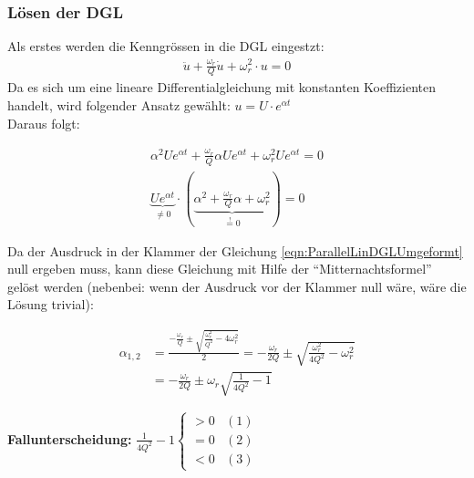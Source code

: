 \subsubsection{Lösen der DGL}
Als erstes werden die Kenngrössen in die DGL eingestzt:
\begin{align}
\boxed{\ddot{u} + \frac{\omega_r}{Q}\dot{u} + \omega_r^2 \cdot u = 0}
\end{align}
Da es sich um eine lineare Differentialgleichung mit konstanten Koeffizienten
handelt, wird folgender Ansatz gewählt: $u = U \cdot e^{\alpha t}$ \\
Daraus folgt: 

\begin{align}
\alpha^2 U e^{\alpha t} + \frac{\omega_r}{Q}\alpha U e^{\alpha t} + \omega_r^2 U
e^{\alpha t} = 0 \nonumber \\
\underbrace{U e^{\alpha t}}_{\neq 0} \cdot (\underbrace{\alpha^2 +
\frac{\omega_r}{Q} \alpha + \omega_r^2}_{\overset{!}{=} 0}) = 0
\label{eqn:ParallelLinDGLUmgeformt}
\end{align}

Da der Ausdruck in der Klammer der Gleichung \ref{eqn:ParallelLinDGLUmgeformt}
null ergeben muss, kann diese Gleichung mit Hilfe der "`Mitternachtsformel"'
gelöst werden (nebenbei: wenn der Ausdruck vor der Klammer null wäre, wäre die
Lösung trivial):

\begin{align}
\alpha_{1,2} &= \frac{-\frac{\omega_r}{Q} \pm \sqrt{\frac{\omega_r^2}{Q^2} -
4\omega_r^2}}{2} = - \frac{\omega_r}{2Q} \pm \sqrt{\frac{\omega_r^2}{4Q^2} -
\omega_r^2} \nonumber \\
 &= -\frac{\omega_r}{2Q} \pm \omega_r \sqrt{\frac{1}{4Q^2} -1}
\end{align}

\textbf{Fallunterscheidung:} 
$\frac{1}{4Q^2} -1 \begin{cases}
 > 0 & (1)\\
 = 0 & (2) \\
 < 0 & (3)
\end{cases}$

